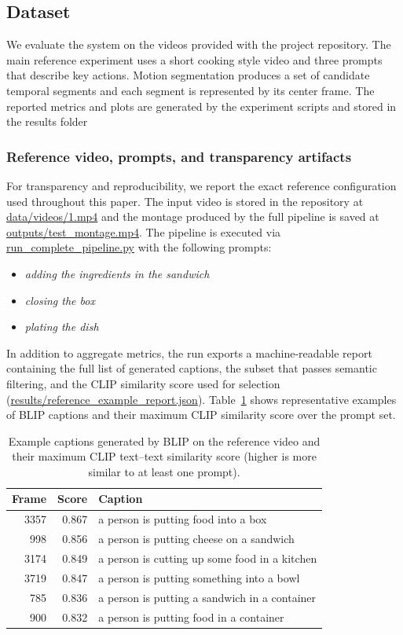 \documentclass[conference,compsoc]{IEEEtran}
\begin{document}
\subsection{Dataset}
We evaluate the system on the videos provided with the project repository. The main reference experiment uses a short cooking style video and three prompts that describe key actions. Motion segmentation produces a set of candidate temporal segments and each segment is represented by its center frame. The reported metrics and plots are generated by the experiment scripts and stored in the results folder

\subsubsection{Reference video, prompts, and transparency artifacts}
For transparency and reproducibility, we report the exact reference configuration used throughout this paper. The input video is stored in the repository at \url{data/videos/1.mp4} and the montage produced by the full pipeline is saved at \url{outputs/test_montage.mp4}. The pipeline is executed via \url{run_complete_pipeline.py} with the following prompts:
\begin{itemize}
\item \emph{adding the ingredients in the sandwich}
\item \emph{closing the box}
\item \emph{plating the dish}
\end{itemize}
In addition to aggregate metrics, the run exports a machine-readable report containing the full list of generated captions, the subset that passes semantic filtering, and the CLIP similarity score used for selection (\url{results/reference_example_report.json}). Table~\ref{tab:captions} shows representative examples of BLIP captions and their maximum CLIP similarity score over the prompt set.

\begin{table}[t]
\centering
\caption{Example captions generated by BLIP on the reference video and their maximum CLIP text--text similarity score (higher is more similar to at least one prompt).}
\label{tab:captions}
\scriptsize
\begin{tabularx}{\linewidth}{r r X}
\toprule
Frame & Score & Caption \\
\midrule
3357 & 0.867 & a person is putting food into a box \\
998  & 0.856 & a person is putting cheese on a sandwich \\
3174 & 0.849 & a person is cutting up some food in a kitchen \\
3719 & 0.847 & a person is putting something into a bowl \\
785  & 0.836 & a person is putting a sandwich in a container \\
900  & 0.832 & a person is putting food in a container \\
\bottomrule
\end{tabularx}
\end{table}
\end{document}
